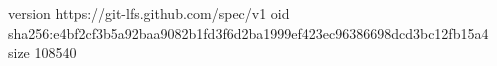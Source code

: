version https://git-lfs.github.com/spec/v1
oid sha256:e4bf2cf3b5a92baa9082b1fd3f6d2ba1999ef423ec96386698dcd3bc12fb15a4
size 108540
